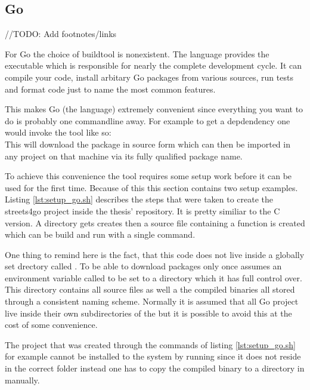 \subsection{Go}
\label{subsec:Implementation::Setup::Go}

//TODO: Add footnotes/links

For Go the choice of buildtool is nonexistent. The language provides the  executable which is responsible for nearly the complete development cycle. It can compile your code, install arbitary Go packages from various sources, run tests and format code just to name the most common features.

This makes Go (the language) extremely convenient since everything you want to do is probably one commandline away. For example to get a depdendency one would invoke the tool like so:
\\
This will download the package in source form which can then be imported in any project on that machine via its fully qualified package name.

To achieve this convenience the  tool requires some setup work before it can be used for the first time. Because of this this section contains two setup examples.
\\


Listing \ref{lst:setup_go.sh} describes the steps that were taken to create the streets4go project inside the thesis' repository. It is pretty similiar to the C version. A directory gets creates then a source file containing a  function is created which can be build and run with a single command.

One thing to remind here is the fact, that this code does not live inside a globally set drectory called . To be able to download packages only once  assumes an environment variable called  to be set to a directory which it has full control over. This directory contains all source files as well a the compiled binaries all stored through a consistent naming scheme. Normally it is assumed that all Go project live inside their own subdirectories of the  but it is possible to avoid this at the cost of some convenience.

The project that was created through the commands of listing \ref{lst:setup_go.sh} for example cannot be installed to the system by running  since it does not reside in the correct folder instead one has to copy the compiled binary to a directory in  manually.

